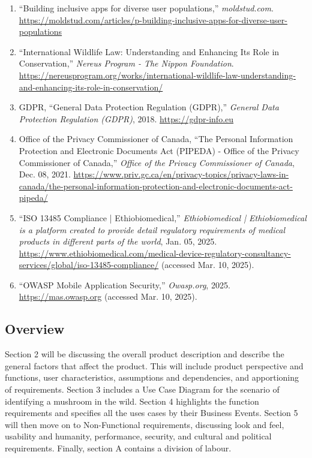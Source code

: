 \documentclass{article}
\begin{document}
\begin{enumerate}
    \item “Building inclusive apps for diverse user populations,” \textit{moldstud.com}. \url{https://moldstud.com/articles/p-building-inclusive-apps-for-diverse-user-populations}
    \item “International Wildlife Law: Understanding and Enhancing Its Role in Conservation,” \textit{Nereus Program - The Nippon Foundation}. \url{https://nereusprogram.org/works/international-wildlife-law-understanding-and-enhancing-its-role-in-conservation/}
    \item GDPR, “General Data Protection Regulation (GDPR),” \textit{General Data Protection Regulation (GDPR)}, 2018. \url{https://gdpr-info.eu}
    \item Office of the Privacy Commissioner of Canada, “The Personal Information Protection and Electronic Documents Act (PIPEDA) - Office of the Privacy Commissioner of Canada,” \textit{Office of the Privacy Commissioner of Canada}, Dec. 08, 2021. \url{https://www.priv.gc.ca/en/privacy-topics/privacy-laws-in-canada/the-personal-information-protection-and-electronic-documents-act-pipeda/}
    \item “ISO 13485 Compliance | Ethiobiomedical,” \textit{Ethiobiomedical | Ethiobiomedical is a platform created to provide detail regulatory requirements of medical products in different parts of the world}, Jan. 05, 2025. \url{https://www.ethiobiomedical.com/medical-device-regulatory-consultancy-services/global/iso-13485-compliance/} (accessed Mar. 10, 2025).
    \item “OWASP Mobile Application Security,” \textit{Owasp.org}, 2025. \url{https://mas.owasp.org} (accessed Mar. 10, 2025).
\end{enumerate}
\endgroup
% 
% 
% 
% 


\subsection{Overview}
\label{sub:overview}

Section 2 will be discussing the overall product description and describe the general factors that affect the product. This will include product perspective and functions, user characteristics, assumptions and dependencies, and apportioning of requirements. Section 3 includes a Use Case Diagram for the scenario of identifying a mushroom in the wild. Section 4 highlights the function requirements and specifies all the uses cases by their Business Events. Section 5 will then move on to Non-Functional requirements, discussing look and feel, usability and humanity, performance, security, and cultural and political requirements. Finally, section A contains a division of labour.
\end{document}
